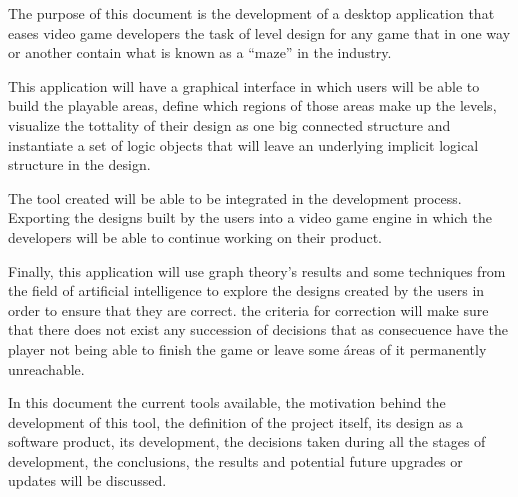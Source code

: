 The purpose of this document is the development of a desktop application that eases video game developers the task of level design for any game that in one way or another contain what is known as a ``maze'' in the industry.

This application will have a graphical interface in which users will be able to build the playable areas, define which regions of those areas make up the levels, visualize the tottality of their design as one big connected structure and instantiate a set of logic objects that will leave an underlying implicit logical structure in the design.

The tool created will be able to be integrated in the development process. Exporting the designs built by the users into a video game engine in which the developers will be able to continue working on their product.

Finally, this application will use graph theory's results and some techniques from the field of artificial intelligence to explore the designs created by the users in order to ensure that they are correct. the criteria for correction will make sure that there does not exist any succession of decisions that as consecuence have the player not being able to finish the game or leave some áreas of it permanently unreachable.

In this document the current tools available, the motivation behind the development of this tool, the definition of the project itself, its design as a software product, its development, the decisions taken during all the stages of development, the conclusions, the results and potential future upgrades or updates will be discussed.


